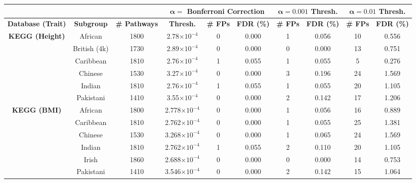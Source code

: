 \documentclass[10pt]{article}
\begin{document}

\begin{landscape}

\setlength{\extrarowheight}{3pt}

\begin{table}[ht]
\centering
\vspace*{-1.5cm}
\hspace*{-2em}
\begin{tabular}{|c|c|c|ccc|cc|cc|}
  \hline
& & & \multicolumn{3}{c|}{\textbf{$\bm{\alpha =}$ Bonferroni Correction}} & \multicolumn{2}{c|}{\textbf{$\bm{\alpha = 0.001}$ Thresh.}} & \multicolumn{2}{c|}{\textbf{$\bm{\alpha = 0.01}$ Thresh.}}\\
\hline
\textbf{Database (Trait)} & \textbf{Subgroup} & \textbf{\# Pathways} & \textbf{Thresh.} & \textbf{\# FPs} & \textbf{FDR (\%)} & \textbf{\# FPs} & \textbf{FDR (\%)} &  \textbf{\# FPs} & \textbf{FDR (\%)} \\ 
  \hline
\multirow{6.5}{*}{\textbf{KEGG (Height)}} & African & 1800 & 2.78$\times10^{-4}$ & 0 & 0.000  & 1 & 0.056 & 10 & 0.556 \\ 
  & British (4k) & 1730 & 2.89$\times10^{-4}$ & 0 & 0.000 & 0 & 0.000 & 13 & 0.751 \\ 
  & Caribbean & 1810 & 2.76$\times10^{-4}$ & 1 & 0.055 & 1 & 0.055 & 5 & 0.276 \\ 
  & Chinese & 1530 & 3.27$\times10^{-4}$ & 0 & 0.000 & 3 & 0.196 & 24 & 1.569 \\ 
  & Indian & 1810 & 2.76$\times10^{-4}$ & 1 & 0.055 & 1 & 0.055 & 20 & 1.105 \\ 
  & Pakistani & 1410 & 3.55$\times10^{-4}$ & 0 & 0.000 & 2 & 0.142 & 17 & 1.206 \\ 
  \hline
\multirow{6.5}{*}{\textbf{KEGG (BMI)}} & African & 1800 & 2.778$\times10^{-4}$ & 0 & 0.000 & 1 & 0.056 & 16 & 0.889 \\
 & Caribbean & 1810 & 2.762$\times10^{-4}$ & 0 & 0.000 & 1 & 0.055 & 25 & 1.381 \\ 
 & Chinese & 1530 & 3.268$\times10^{-4}$ & 0 & 0.000 & 1 & 0.065 & 24 & 1.569 \\ 
 & Indian & 1810 & 2.762$\times10^{-4}$ & 1 & 0.055 & 2 & 0.110 & 20 & 1.105 \\ 
 & Irish & 1860 & 2.688$\times10^{-4}$ & 0 & 0.000 & 0 & 0.000 & 14 & 0.753 \\ 
 & Pakistani & 1410 & 3.546$\times10^{-4}$ & 0 & 0.000 & 2 & 0.142 & 15 & 1.064 \\ 
  \hline

\end{tabular}
\end{table}
\end{landscape}
\end{document}
